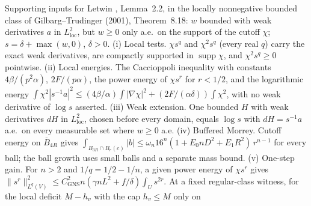 \begin{lemma}
  \label{lem:letwin-local-moser-inputs}
  \leanok
  Supporting inputs for Letwin \cite{Letwin2026QuadraticKLS}, Lemma~2.2, in the locally nonnegative bounded class of
  Gilbarg--Trudinger (2001), Theorem~8.18: $w$ bounded with weak derivatives $a$ in $L^2_{\mathrm{loc}}$, but $w\ge0$ only
  a.e.\ on the support of the cutoff $\chi$; $s=\delta+\max(w,0)$, $\delta>0$.
  (i) Local tests. $\chi s^q$ and $\chi^2s^q$ (every real $q$) carry the exact weak derivatives, are compactly supported in
  $\operatorname{supp}\chi$, and $\chi^2s^q\ge0$ pointwise.
  (ii) Local energies. The Caccioppoli inequality with constants $4\beta/(p^2\alpha)$, $2F/(p\alpha)$, the power energy of
  $\chi s^r$ for $r<1/2$, and the logarithmic energy $\int\chi^2|s^{-1}a|^2\le(4\beta/\alpha)\int|\nabla\chi|^2+
  (2F/(\alpha\delta))\int\chi^2$, with no weak derivative of $\log s$ asserted.
  (iii) Weak extension. One bounded $H$ with weak derivatives $dH$ in $L^2_{\mathrm{loc}}$, chosen before every domain,
  equals $\log s$ with $dH=s^{-1}a$ a.e.\ on every measurable set where $w\ge0$ a.e.
  (iv) Buffered Morrey. Cutoff energy on $\overline B_{4R}$ gives $\int_{B_{3R}\cap B_r(c)}|b|\le\omega_n16^n
  (1+E_0nD^2+E_1R^2)\,r^{n-1}$ for every ball; the ball growth uses small balls and a separate mass bound.
  (v) One-step gain. For $n>2$ and $1/q=1/2-1/n$, a given power energy of $\chi s^r$ gives
  $\|s^r\|_{L^q(V)}^2\le C_{\mathrm{GNS}}^2n(\gamma nL^2+f/\delta)\int_Us^{2r}$.
  At a fixed regular-class witness, for the local deficit $M-h_v$ with the cap $h_v\le M$ only on

\end{lemma}
